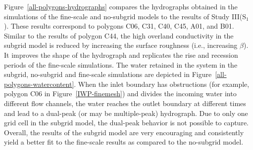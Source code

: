Figure~\ref{all-polygons-hydrographs} compares the hydrographs obtained in the simulations of the fine-scale and no-subgrid models to the results of Study III(S$_1$). These results correspond to polygons C06, C31, C40, C45, A01, and B01. Similar to the results of polygon C44, the high overland conductivity in the subgrid model is reduced by increasing the surface roughness (i.e., increasing $\beta$). It improves the shape of the hydrograph and replicates the rise and recession periods of the fine-scale simulations.
The water retained in the system in the subgrid, no-subgrid and fine-scale simulations are depicted in Figure~\ref{all-polygons-watercontent}. 
When the inlet boundary has obstructions (for example, polygon C06 in Figure~\ref{IWP-finemesh}) and divides the incoming water into different flow channels, the water reaches the outlet boundary at different times and lead to a dual-peak (or may be multiple-peak) hydrograph.  Due to only one grid cell in the subgrid model, the dual-peak behavior is not possible to capture.
Overall, the results of the subgrid model are very encouraging and consistently yield a better fit to the fine-scale results as compared to the no-subgrid model.
%
